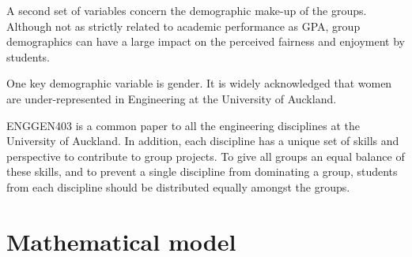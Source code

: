 \documentclass[12pt]{ORSNZ}
\begin{document}
A second set of variables concern the demographic make-up of the groups. Although not as strictly related to academic performance as GPA, group demographics can have a large impact on the perceived fairness and enjoyment by students.

One key demographic variable is gender. It is widely acknowledged that women are under-represented in Engineering at the University of Auckland.

ENGGEN403 is a common paper to all the engineering disciplines at the University of Auckland. In addition, each discipline has a unique set of skills and perspective to contribute to group projects. To give all groups an equal balance of these skills, and to prevent a single discipline from dominating a group, students from each discipline should be distributed equally amongst the groups.

\section{Mathematical model}
\end{document}
